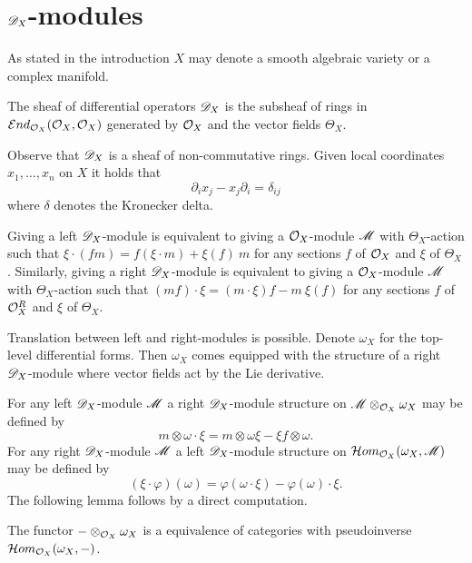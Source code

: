 \section{$\mathscr{D}_X$-modules}
As stated in the introduction $X$ may denote a smooth algebraic variety or a complex manifold.
\begin{definition}
  The sheaf of differential operators $\mathscr{D}_X$ is the subsheaf of rings in $\mathcal{E}nd_{\mathcal{O}_X}(\mathcal{O}_X,\mathcal{O}_X)$ generated by $\mathcal{O}_X$ and the vector fields $\Theta_X$.
\end{definition}
Observe that $\mathscr{D}_X$ is a sheaf of non-commutative rings.
Given local coordinates $x_1,\ldots, x_n$ on $X$ it holds that
$$\partial_i x_j - x_j\partial_i = \delta_{ij} $$
where $\delta$ denotes the Kronecker delta.

Giving a left $\mathscr{D}_X$-module is equivalent to giving a $\mathcal{O}_X$-module $\mathscr{M}$ with $\Theta_X$-action such that
$\xi\cdot (fm) = f (\xi \cdot m)  + \xi(f)\ m  $
for any sections $f$ of $\mathcal{O}_X$ and $\xi$ of $\Theta_X$. Similarly, giving a right $\mathscr{D}_X$-module is equivalent to giving a $\mathcal{O}_X$-module $\mathscr{M}$ with $\Theta_X$-action such that
$(mf)\cdot\xi = (m\cdot\xi)f - m\ \xi(f) $ for any sections $f$ of $\mathcal{O}_X^R$ and $\xi$ of $\Theta_X$.

Translation between left and right-modules is possible.
Denote $\omega_X$ for the top-level differential forms.
Then $\omega_X$ comes equipped with the structure of a right $\mathscr{D}_X$-module where vector fields act by the Lie derivative.

For any left $\mathscr{D}_X$-module $\mathscr{M}$ a right $\mathscr{D}_X$-module structure on $\mathscr{M}\otimes_{\mathcal{O}_X}\omega_X$ may be defined by
$$m\otimes \omega \cdot \xi = m\otimes \omega\xi - \xi f \otimes \omega.$$
For any right $\mathscr{D}_X$-module $\mathscr{M}$ a left $\mathscr{D}_X$-module structure on $\mathcal{H}om_{\mathcal{O}_X}(\omega_X, \mathscr{M})$ may be defined by
$$(\xi\cdot \varphi)(\omega) = \varphi(\omega \cdot \xi) - \varphi(\omega)\cdot \xi. $$
The following lemma follows by a direct computation.
\begin{lemma}
  The functor ${-}\otimes_{\mathcal{O}_X}\omega_X$ is a equivalence of categories with pseudoinverse  $\mathcal{H}om_{\mathcal{O}_X}(\omega_X,{-})$.
\end{lemma}
